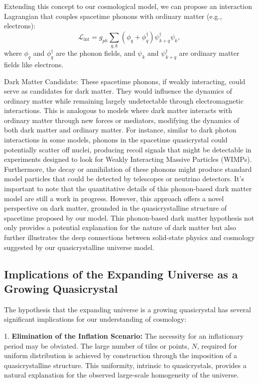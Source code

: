 \documentclass{article}
\begin{document}
Extending this concept to our cosmological model, we can propose an interaction Lagrangian that couples spacetime phonons with ordinary matter (e.g., electrons):
\begin{equation}
\mathcal{L}_{\text{int}} = g_{ph} \sum_{q,k} (\phi_q + \phi_q^{\dagger}) \psi_{k+q}^{\dagger} \psi_k,
\end{equation}
where $\phi_q$ and $\phi_q^{\dagger}$ are the phonon fields, and $\psi_k$ and $\psi_{k+q}^{\dagger}$ are ordinary matter fields like electrons.

Dark Matter Candidate: These spacetime phonons, if weakly interacting, could serve as candidates for dark matter. They would influence the dynamics of ordinary matter while remaining largely undetectable through electromagnetic interactions. This is analogous to models where dark matter interacts with ordinary matter through new forces or mediators, modifying the dynamics of both dark matter and ordinary matter.
For instance, similar to dark photon interactions in some models, phonons in the spacetime quasicrystal could potentially scatter off nuclei, producing recoil signals that might be detectable in experiments designed to look for Weakly Interacting Massive Particles (WIMPs). Furthermore, the decay or annihilation of these phonons might produce standard model particles that could be detected by telescopes or neutrino detectors.
It's important to note that the quantitative details of this phonon-based dark matter model are still a work in progress. However, this approach offers a novel perspective on dark matter, grounded in the quasicrystalline structure of spacetime proposed by our model.
This phonon-based dark matter hypothesis not only provides a potential explanation for the nature of dark matter but also further illustrates the deep connections between solid-state physics and cosmology suggested by our quasicrystalline universe model.


\subsection{Implications of the Expanding Universe as a Growing Quasicrystal}

The hypothesis that the expanding universe is a growing quasicrystal has several significant implications for our understanding of cosmology:

1. \textbf{Elimination of the Inflation Scenario:} The necessity for an inflationary period may be obviated. The large number of tiles or points, $ N $, required for uniform distribution is achieved by construction through the imposition of a quasicrystalline structure. This uniformity, intrinsic to quasicrystals, provides a natural explanation for the observed large-scale homogeneity of the universe.
\end{document}
